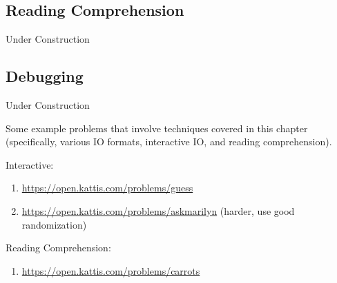 \subsection{Reading Comprehension}

Under Construction

\subsection{Debugging}

Under Construction

\hrulefill

Some example problems that involve techniques covered in this chapter (specifically, various IO formats, interactive IO, and reading comprehension).


Interactive: 
\begin{enumerate}
\item \url{https://open.kattis.com/problems/guess}
\item \url{https://open.kattis.com/problems/askmarilyn} (harder, use good randomization)
\end{enumerate}

Reading Comprehension:
\begin{enumerate}
\item \url{https://open.kattis.com/problems/carrots}
\end{enumerate}